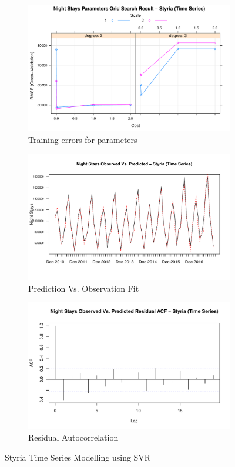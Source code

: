 \documentclass[a4paper,reqno,]{article}
\begin{document}
\begin{figure}[H]
  \centering
  \begin{subfigure}[b]{0.32\linewidth}
    \includegraphics[width=\linewidth]{images/SVR/StyriaGrid.pdf}
    \caption{Training errors for parameters}
  \end{subfigure}
  \begin{subfigure}[b]{0.32\linewidth}
    \includegraphics[width=\linewidth]{images/SVR/StyriaTimeSeries.pdf}
    \caption{Prediction Vs. Observation Fit}
  \end{subfigure}
  \begin{subfigure}[b]{0.32\linewidth}
    \includegraphics[width=\linewidth]{images/SVR/StyriaACF.pdf}
    \caption{Residual Autocorrelation}
  \end{subfigure}
  \caption{Styria Time Series Modelling using SVR}
  \label{fig:Time Series}
\end{figure}
\end{document}
